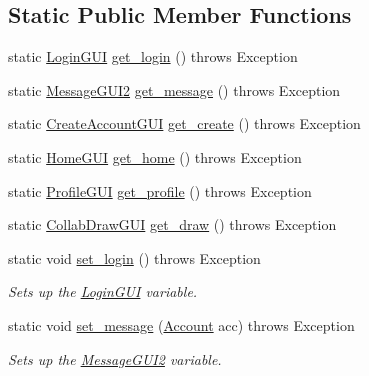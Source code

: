 \subsection*{Static Public Member Functions}
\begin{DoxyCompactItemize}
\item 
static \hyperlink{class_login_g_u_i}{Login\+G\+UI} \hyperlink{class_main_adbc9a9d0ef627e04ed81e7e61689dc01}{get\+\_\+login} ()  throws Exception     
\item 
static \hyperlink{class_message_g_u_i2}{Message\+G\+U\+I2} \hyperlink{class_main_a21b6962a0baf060031b59f4966ff6abf}{get\+\_\+message} ()  throws Exception     
\item 
static \hyperlink{class_create_account_g_u_i}{Create\+Account\+G\+UI} \hyperlink{class_main_a0d47d64d3fd1d384ca1e9327d614e700}{get\+\_\+create} ()  throws Exception     
\item 
static \hyperlink{class_home_g_u_i}{Home\+G\+UI} \hyperlink{class_main_a59e90cad9e7b3a6dc7e6f3ff60461552}{get\+\_\+home} ()  throws Exception     
\item 
static \hyperlink{class_profile_g_u_i}{Profile\+G\+UI} \hyperlink{class_main_a73e8f5786c0c767bdc6f236199bddd70}{get\+\_\+profile} ()  throws Exception     
\item 
static \hyperlink{class_collab_draw_g_u_i}{Collab\+Draw\+G\+UI} \hyperlink{class_main_a8e7bcb41f4403124bc9bca5018d30e7a}{get\+\_\+draw} ()  throws Exception     
\item 
\mbox{\label{class_main_a615e65902105d5888a9050b279c89d80}} 
static void \hyperlink{class_main_a615e65902105d5888a9050b279c89d80}{set\+\_\+login} ()  throws Exception     
\begin{DoxyCompactList}\small\item\em Sets up the \hyperlink{class_login_g_u_i}{Login\+G\+UI} variable. \end{DoxyCompactList}\item 
\mbox{\label{class_main_a40f46d7ff4e56752d41c9db5e451172f}} 
static void \hyperlink{class_main_a40f46d7ff4e56752d41c9db5e451172f}{set\+\_\+message} (\hyperlink{class_account}{Account} acc)  throws Exception     
\begin{DoxyCompactList}\small\item\em Sets up the \hyperlink{class_message_g_u_i2}{Message\+G\+U\+I2} variable. \end{DoxyCompactList}\item 

\end{DoxyCompactItemize}
